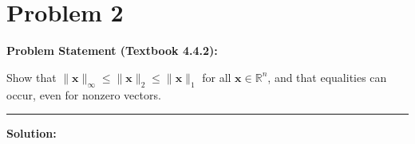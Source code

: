\clearpage
\section*{Problem 2}

\textbf{Problem Statement (Textbook 4.4.2):} 

Show that $\|\mathbf{x}\|_\infty \leq \|\mathbf{x}\|_2 \leq \|\mathbf{x}\|_1$ for all $\mathbf{x} \in \mathbb{R}^n$, and that equalities can occur, even for nonzero vectors.

\noindent\rule{\textwidth}{0.4pt}

\vspace{1em}

\textbf{Solution:}

